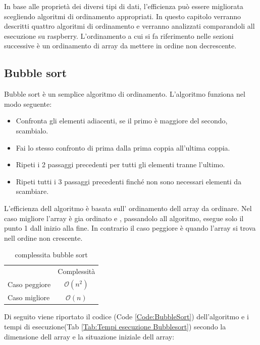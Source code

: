 \documentclass[12pt,a4paper]{report}
\begin{document}
In base alle proprietà dei diversi tipi di dati, l'efficienza può essere migliorata scegliendo algoritmi di ordinamento appropriati. In questo capitolo verranno descritti quattro algoritmi di ordinamento e verranno analizzati comparandoli all esecuzione su raspberry. L'ordinamento a cui si fa riferimento nelle sezioni successive è un ordinamento di array da mettere in ordine non decrescente.

\subsection{Bubble sort}
Bubble sort è un semplice algoritmo di ordinamento. 
L'algoritmo funziona nel modo seguente:
\begin{itemize}
	\item Confronta gli elementi adiacenti, se il primo è maggiore del secondo, scambialo.
	\item Fai lo stesso confronto di prima dalla prima coppia all'ultima coppia. 
	\item Ripeti i 2 passaggi precedenti per tutti gli elementi tranne l'ultimo.
	\item Ripeti tutti i 3 passaggi precedenti finché non sono necessari elementi da scambiare.
\end{itemize}
L'efficienza dell algoritmo è basata sull' ordinamento dell array da ordinare. Nel caso migliore l'array è gia ordinato e , passandolo all algoritmo, esegue solo il punto 1 dall inizio alla fine. In contrario il caso peggiore è quando l'array si trova nell ordine non crescente.
\begin{table}[ht]
	\centering
	\begin{tabular}{lc}
              & Complessità \\
Caso peggiore &       $ \mathcal{O}(n^2)$      \\
Caso migliore &           $ \mathcal{O}(n)$   \\
\end{tabular}
	\caption{complessita bubble sort}
	\label{Tab:CompBubbleSort}
\end{table}

Di seguito viene riportato il codice (Code \ref{Code:BubbleSort}) dell'algoritmo e i tempi di esecuzione(Tab \ref{Tab:Tempi esecuzione Bubblesort}) secondo la dimensione dell array e la situazione iniziale dell array:
	
\end{document}
